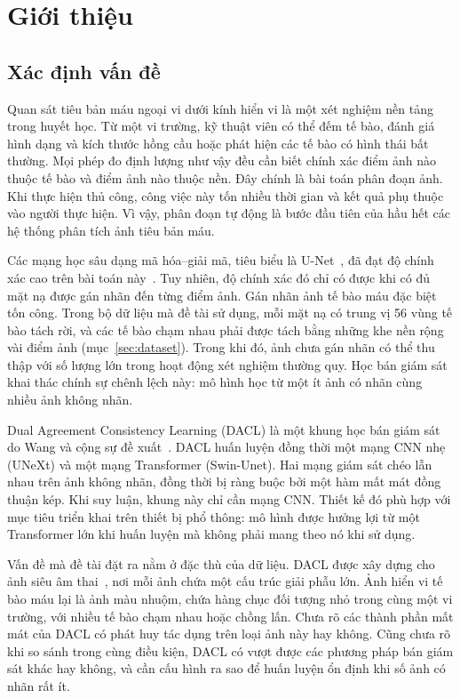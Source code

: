 \chapter{Giới thiệu}
\label{chap:gioithieu}

\section{Xác định vấn đề}

Quan sát tiêu bản máu ngoại vi dưới kính hiển vi là một xét nghiệm nền tảng trong huyết học. Từ một vi trường, kỹ thuật viên có thể đếm tế bào, đánh giá hình dạng và kích thước hồng cầu hoặc phát hiện các tế bào có hình thái bất thường. Mọi phép đo định lượng như vậy đều cần biết chính xác điểm ảnh nào thuộc tế bào và điểm ảnh nào thuộc nền. Đây chính là bài toán phân đoạn ảnh. Khi thực hiện thủ công, công việc này tốn nhiều thời gian và kết quả phụ thuộc vào người thực hiện. Vì vậy, phân đoạn tự động là bước đầu tiên của hầu hết các hệ thống phân tích ảnh tiêu bản máu.

Các mạng học sâu dạng mã hóa--giải mã, tiêu biểu là U-Net~\cite{ronneberger2015unet}, đã đạt độ chính xác cao trên bài toán này~\cite{depto2021blood}. Tuy nhiên, độ chính xác đó chỉ có được khi có đủ mặt nạ được gán nhãn đến từng điểm ảnh. Gán nhãn ảnh tế bào máu đặc biệt tốn công. Trong bộ dữ liệu mà đề tài sử dụng, mỗi mặt nạ có trung vị 56 vùng tế bào tách rời, và các tế bào chạm nhau phải được tách bằng những khe nền rộng vài điểm ảnh (mục~\ref{sec:dataset}). Trong khi đó, ảnh chưa gán nhãn có thể thu thập với số lượng lớn trong hoạt động xét nghiệm thường quy. Học bán giám sát khai thác chính sự chênh lệch này: mô hình học từ một ít ảnh có nhãn cùng nhiều ảnh không nhãn.

Dual Agreement Consistency Learning (DACL) là một khung học bán giám sát do Wang và cộng sự đề xuất~\cite{wang2026dacl}. DACL huấn luyện đồng thời một mạng CNN nhẹ (UNeXt) và một mạng Transformer (Swin-Unet). Hai mạng giám sát chéo lẫn nhau trên ảnh không nhãn, đồng thời bị ràng buộc bởi một hàm mất mát đồng thuận kép. Khi suy luận, khung này chỉ cần mạng CNN. Thiết kế đó phù hợp với mục tiêu triển khai trên thiết bị phổ thông: mô hình được hưởng lợi từ một Transformer lớn khi huấn luyện mà không phải mang theo nó khi sử dụng.

Vấn đề mà đề tài đặt ra nằm ở đặc thù của dữ liệu. DACL được xây dựng cho ảnh siêu âm thai~\cite{wang2026dacl}, nơi mỗi ảnh chứa một cấu trúc giải phẫu lớn. Ảnh hiển vi tế bào máu lại là ảnh màu nhuộm, chứa hàng chục đối tượng nhỏ trong cùng một vi trường, với nhiều tế bào chạm nhau hoặc chồng lấn. Chưa rõ các thành phần mất mát của DACL có phát huy tác dụng trên loại ảnh này hay không. Cũng chưa rõ khi so sánh trong cùng điều kiện, DACL có vượt được các phương pháp bán giám sát khác hay không, và cần cấu hình ra sao để huấn luyện ổn định khi số ảnh có nhãn rất ít.


